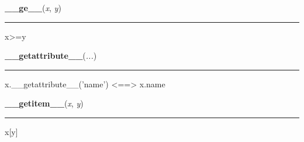     \vspace{0.5ex}

    \begin{boxedminipage}{\textwidth}

    \raggedright \textbf{\_\_ge\_\_}(\textit{x}, \textit{y})

    \vspace{-1.5ex}

    \rule{\textwidth}{0.5\fboxrule}

x{\textgreater}=y
    \vspace{1ex}

    \end{boxedminipage}

    \label{object:__getattribute__}

    \vspace{0.5ex}

    \begin{boxedminipage}{\textwidth}

    \raggedright \textbf{\_\_getattribute\_\_}(\textit{...})

    \vspace{-1.5ex}

    \rule{\textwidth}{0.5\fboxrule}

x.{\_}{\_}getattribute{\_}{\_}('name') {\textless}=={\textgreater} x.name
    \vspace{1ex}

    \end{boxedminipage}

    \label{numpy:ndarray:__getitem__}

    \vspace{0.5ex}

    \begin{boxedminipage}{\textwidth}

    \raggedright \textbf{\_\_getitem\_\_}(\textit{x}, \textit{y})

    \vspace{-1.5ex}

    \rule{\textwidth}{0.5\fboxrule}

x{[}y{]}
    \vspace{1ex}

    \end{boxedminipage}

    \label{numpy:ndarray:__getslice__}

